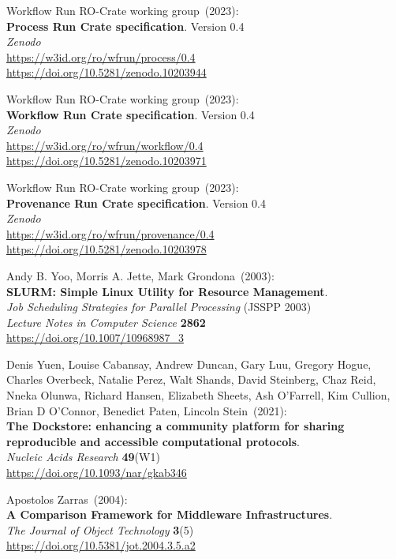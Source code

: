 \begin{thebibliography}{9}
Workflow Run RO-Crate working group~(2023): \\
\textbf{Process Run Crate specification}. Version 0.4\\
\emph{Zenodo}\\
\url{https://w3id.org/ro/wfrun/process/0.4}\\
\url{https://doi.org/10.5281/zenodo.10203944}

Workflow Run RO-Crate working group~(2023): \\
\textbf{Workflow Run Crate specification}. Version 0.4\\
\emph{Zenodo}\\
\url{https://w3id.org/ro/wfrun/workflow/0.4}\\
\url{https://doi.org/10.5281/zenodo.10203971}

Workflow Run RO-Crate working group~(2023): \\
\textbf{Provenance Run Crate specification}. Version 0.4\\
\emph{Zenodo}\\
\url{https://w3id.org/ro/wfrun/provenance/0.4}\\
\url{https://doi.org/10.5281/zenodo.10203978}

Andy B. Yoo, Morris A. Jette, Mark Grondona~(2003): \\
\textbf{SLURM: Simple Linux Utility for Resource Management}.\\
\emph{Job Scheduling Strategies for Parallel Processing} (JSSPP 2003)\\
\emph{Lecture Notes in Computer Science} \textbf{2862}\\
\url{https://doi.org/10.1007/10968987_3}

Denis Yuen, Louise Cabansay, Andrew Duncan, Gary Luu, Gregory Hogue, Charles Overbeck, Natalie Perez, Walt Shands, David Steinberg, Chaz Reid, Nneka Olunwa, Richard Hansen, Elizabeth Sheets, Ash O’Farrell, Kim Cullion, Brian D O’Connor, Benedict Paten, Lincoln Stein~(2021): \\
\textbf{The Dockstore: enhancing a community platform for sharing reproducible and accessible computational protocols}.\\
\emph{Nucleic Acids Research} \textbf{49}(W1) \\
\url{https://doi.org/10.1093/nar/gkab346}

Apostolos Zarras~(2004): \\
\textbf{A {Comparison Framework} for {Middleware Infrastructures}}. \\
\emph{The Journal of Object Technology} \textbf{3}(5) \\
\url{https://doi.org/10.5381/jot.2004.3.5.a2}


\end{thebibliography}
